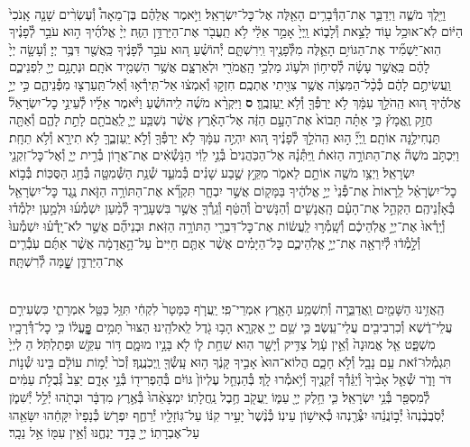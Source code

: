 \documentclass[twoside, openany, parskip=half, 11pt]{book}
\begin{document}
\begin{footnotesize}
\begin{multicols}{2}
\\
וַיֵּ֖לֶךְ מֹשֶׁ֑ה וַיְדַבֵּ֛ר אֶת־הַדְּ֯בָרִ֥ים הָאֵ֖לֶּה אֶל־כׇּל־יִשְׂרָאֵֽל׃ וַיֹּ֣אמֶר אֲלֵהֶ֗ם בֶּן־מֵאָה֩ וְ֯עֶשְׂרִ֨ים שָׁנָ֤ה אָֽנֹכִי֙ הַיּ֔וֹם לֹֽא־אוּכַ֥ל ע֖וֹד לָצֵ֣את וְ֯לָב֑וֹא וַֽיְיָ֙ אָמַ֣ר אֵלַ֔י לֹ֥א תַֽעֲבֹ֖ר אֶת־הַיַּרְדֵּ֥ן הַזֶּֽה׃ יְיָ֨ אֱלֹהֶ֜יךָ ה֣וּא עֹבֵ֣ר לְ֯פָנֶ֗יךָ הֽוּא־יַשְׁמִ֞יד אֶת־הַגּוֹיִ֥ם הָאֵ֛לֶּה מִלְּ֯פָנֶ֖יךָ וִֽירִשְׁתָּ֑ם יְ֯הוֹשֻׁ֗עַ ה֚וּא עֹבֵ֣ר לְ֯פָנֶ֔יךָ כַּֽאֲשֶׁ֖ר דִּבֶּ֥ר יְיָ׃
וְ֯עָשָׂ֤ה יְיָ֙ לָהֶ֔ם כַּֽאֲשֶׁ֣ר עָשָׂ֗ה לְ֯סִיח֥וֹן וּלְע֛וֹג מַלְכֵ֥י הָֽאֱמֹרִ֖י וּלְאַרְצָ֑ם אֲשֶׁ֥ר הִשְׁמִ֖יד אֹתָֽם׃ וּנְתָנָ֥ם יְיָ֖ לִפְנֵיכֶ֑ם וַֽעֲשִׂיתֶ֣ם לָהֶ֔ם כְּ֯כָ֨ל־הַמִּצְוָ֔ה אֲשֶׁ֥ר צִוִּ֖יתִי אֶתְכֶֽם׃ חִזְק֣וּ וְ֯אִמְצ֔וּ אַל־תִּֽירְ֯א֥וּ וְ֯אַל־תַּֽעַרְצ֖וּ מִפְּ֯נֵיהֶ֑ם כִּ֣י יְיָ֣ אֱלֹהֶ֗יךָ ה֚וּא הַֽהֹלֵ֣ךְ עִמָּ֔ךְ לֹ֥א יַרְפְּ֯ךָ֖ וְ֯לֹ֥א יַֽעַזְבֶֽךָּ׃ \textbf{ס}
וַיִּקְרָ֨א מֹשֶׁ֜ה לִֽיהוֹשֻׁ֗עַ וַיֹּ֨אמֶר אֵלָ֜יו לְ֯עֵינֵ֣י כׇל־יִשְׂרָאֵל֘ חֲזַ֣ק וֶֽאֱמָץ֒ כִּ֣י אַתָּ֗ה תָּבוֹא֙ אֶת־הָעָ֣ם הַזֶּ֔ה אֶל־הָאָ֕רֶץ אֲשֶׁ֨ר נִשְׁבַּ֧ע יְיָ֛ לַֽאֲבֹתָ֖ם לָתֵ֣ת לָהֶ֑ם וְ֯אַתָּ֖ה תַּנְחִילֶ֥נָּה אוֹתָֽם׃ וַֽיְיָ֞ ה֣וּא הַֽהֹלֵ֣ךְ לְ֯פָנֶ֗יךָ ה֚וּא יִהְיֶ֣ה עִמָּ֔ךְ לֹ֥א יַרְפְּ֯ךָ֖ וְ֯לֹ֣א יַֽעַזְבֶ֑ךָּ לֹ֥א תִירָ֖א וְ֯לֹ֥א תֵחָֽת׃ וַיִּכְתֹּ֣ב מֹשֶׁה֘ אֶת־הַתּוֹרָ֣ה הַזֹּאת֒ וַֽיִּתְּ֯נָ֗הּ אֶל־הַכֹּֽהֲנִים֙ בְּ֯נֵ֣י לֵוִ֔י הַנֹּ֣שְׂ֯אִ֔ים אֶת־אֲר֖וֹן בְּ֯רִ֣ית יְיָ֑ וְ֯אֶל־כׇּל־זִקְנֵ֖י יִשְׂרָאֵֽל׃ וַיְצַ֥ו מֹשֶׁ֖ה אוֹתָ֣ם לֵאמֹ֑ר מִקֵּ֣ץ שֶׁ֣בַע שָׁנִ֗ים בְּ֯מֹעֵ֛ד שְׁ֯נַ֥ת הַשְּׁ֯מִטָּ֖ה בְּ֯חַ֥ג הַסֻּכּֽוֹת׃ בְּ֯ב֣וֹא כׇל־יִשְׂרָאֵ֗ל לֵֽרָאוֹת֙ אֶת־פְּ֯נֵי֙ יְיָ֣ אֱלֹהֶ֔יךָ בַּמָּק֖וֹם אֲשֶׁ֣ר יִבְחָ֑ר תִּקְרָ֞א אֶת־הַתּוֹרָ֥ה הַזֹּ֛את נֶ֥גֶד כׇּל־יִשְׂרָאֵ֖ל בְּ֯אָזְ֯נֵיהֶֽם׃ הַקְהֵ֣ל אֶת־הָעָ֗ם הָֽאֲנָשִׁ֤ים וְ֯הַנָּשִׁים֙ וְ֯הַטַּ֔ף וְ֯גֵֽרְ֯ךָ֖ אֲשֶׁ֣ר בִּשְׁעָרֶ֑יךָ לְ֯מַ֨עַן יִשְׁמְ֯ע֜וּ וּלְמַ֣עַן יִלְמְ֯ד֗וּ וְ֯יָֽרְ֯אוּ֙ אֶת־יְיָ֣ אֱלֹֽהֵיכֶ֔ם וְ֯שָֽׁמְ֯ר֣וּ לַֽעֲשׂ֔וֹת אֶת־כׇּל־דִּבְרֵ֖י הַתּוֹרָ֥ה הַזֹּֽאת׃ וּבְנֵיהֶ֞ם אֲשֶׁ֣ר לֹא־יָֽדְ֯ע֗וּ יִשְׁמְ֯עוּ֙ וְ֯לָ֣מְ֯ד֔וּ לְ֯יִרְאָ֖ה אֶת־יְיָ֣ אֱלֹֽהֵיכֶ֑ם כׇּל־הַיָּמִ֗ים אֲשֶׁ֨ר אַתֶּ֤ם חַיִּים֙ עַל־הָ֣אֲדָמָ֔ה אֲשֶׁ֨ר אַתֶּ֜ם עֹֽבְ֯רִ֧ים אֶת־הַיַּרְדֵּ֛ן שׇׇׇׇׇׇׁ֖מָּה לְ֯רִשְׁתָּֽהּ׃

\\
הַֽאֲזִ֥ינוּ הַשָּׁמַ֖יִם וַֽאֲדַבֵּ֑רָה וְ֯תִשְׁמַ֥ע הָאָ֖רֶץ אִמְרֵי־פִֽי׃
יַֽעֲרֹ֤ף כַּמָּטָר֙ לִקְחִ֔י תִּזַּ֥ל כַּטַּ֖ל אִמְרָתִ֑י
כִּשְׂעִירִ֣ם עֲלֵי־דֶ֔שֶׁא וְ֯כִרְבִיבִ֖ים עֲלֵי־עֵֽשֶׂב׃
כִּ֛י שֵׁ֥ם יְיָ֖ אֶקְרָ֑א הָב֥וּ גֹ֖דֶל לֵֽאלֹהֵֽינוּ׃
הַצּוּר֙ תָּמִ֣ים פׇׇׇׇׇׇׇׇׇׇּֽעֳל֔וֹ כִּ֥י כׇל־דְּ֯רָכָ֖יו מִשְׁפָּ֑ט
אֵ֤ל אֱמוּנָה֙ וְ֯אֵ֣ין עָ֔וֶל צַדִּ֥יק וְ֯יָשָׁ֖ר הֽוּא׃
שִׁחֵ֥ת ל֛וֹ לֹ֖א בָּנָ֣יו מוּמָ֑ם דּ֥וֹר עִקֵּ֖שׁ וּפְתַלְתֹּֽל׃
הַ לְיְיָ֙ תִּגְמְ֯לוּ־זֹ֔את עַ֥ם נָבָ֖ל וְ֯לֹ֣א חָכָ֑ם
הֲלוֹא־הוּא֙ אָבִ֣יךָ קָּנֶ֔ךָ ה֥וּא עָֽשְׂ֯ךָ֖ וַֽיְכֹֽנֲנֶֽךָ׃
זְ֯כֹר֙ יְ֯מ֣וֹת עוֹלָ֔ם בִּ֖ינוּ שְׁ֯נ֣וֹת דֹּר וָדֹ֑ר
שְׁ֯אַ֤ל אָבִ֨יךָ֙ וְ֯יַגֵּ֔דְ֯ךָ זְ֯קֵנֶ֖יךָ וְ֯יֹ֥אמְ֯רוּ לָֽךְ׃
בְּ֯הַנְחֵ֤ל עֶלְיוֹן֙ גּוֹיִ֔ם בְּ֯הַפְרִיד֖וֹ בְּ֯נֵ֣י אָדָ֑ם
יַצֵּב֙ גְּ֯בֻלֹ֣ת עַמִּ֔ים לְ֯מִסְפַּ֖ר בְּ֯נֵ֥י יִשְׂרָאֵֽל׃
כִּ֛י חֵ֥לֶק יְיָ֖ עַמּ֑וֹ יַֽעֲקֹ֖ב חֶ֥בֶל נַֽחֲלָתֽוֹ׃
יִמְצָאֵ֨הוּ֙ בְּ֯אֶ֣רֶץ מִדְבָּ֔ר וּבְתֹ֖הוּ יְ֯לֵ֣ל יְ֯שִׁמֹ֑ן
יְ֯סֹֽבֲבֶ֨נְהוּ֙ יְ֯ב֣וֹנֲנֵ֔הוּ יִצְּ֯רֶ֖נְהוּ כְּ֯אִישׁ֥וֹן עֵינֽוֹ׃
כְּ֯נֶ֨שֶׁר֙ יָעִ֣יר קִנּ֔וֹ עַל־גּֽוֹזָלָ֖יו יְ֯רַחֶ֑ף
יִפְרֹ֤שׂ כְּ֯נָפָיו֙ יִקָּחֵ֔הוּ יִשָּׂאֵ֖הוּ עַל־אֶבְרָתֽוֹ׃
יְיָ֖ בָּדָ֣ד יַנְחֶ֑נּוּ וְ֯אֵ֥ין עִמּ֖וֹ אֵ֥ל נֵכָֽר׃


\end{multicols}
\end{footnotesize}
\end{document}

